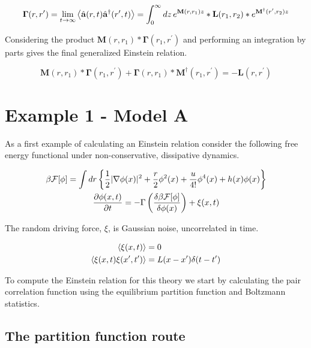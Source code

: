 \begin{equation}
	\mathbf{\Gamma}(r, r^\prime) = \lim_{t\rightarrow\infty} \left\langle \hat{\mathbf{a}}(r, t)\hat{\mathbf{a}}^\dagger(r^\prime, t) \right\rangle =
	\int_0^\infty dz \,e^{\mathbf{M}(r, r_1)z}\ast\mathbf{L}(r_1, r_2)\ast e^{\mathbf{M}^\dagger(r^\prime, r_2)z}
\end{equation}

Considering the product $\mathbf{M}(r, r_1)\ast\mathbf{\Gamma}(r_1, r^\prime)$ and performing an integration by parts gives the final generalized Einstein relation.

\begin{equation}
	\mathbf{M}(r, r_1)\ast\mathbf{\Gamma}(r_1, r^\prime) + \mathbf{\Gamma}(r, r_1)\ast\mathbf{M}^\dagger(r_1, r^\prime) = -\mathbf{L}(r, r^\prime)
\end{equation}

\section{Example 1 - Model A}

As a first example of calculating an Einstein relation consider the following free energy functional under non-conservative, dissipative dynamics.

\begin{gather}
\beta \mathcal{F}[\phi] = \int dr \left\lbrace \frac{1}{2}\vert \nabla \phi(x) \vert^2 + \frac{r}{2}\phi^2(x) + \frac{u}{4!}\phi^4(x)  + h(x)\phi(x)\right\rbrace \\
\frac{\partial \phi(x,t)}{\partial t} = -\Gamma \left(\frac{\delta \beta \mathcal{F}[\phi]}{\delta \phi(x)}\right) + \xi(x, t)
\end{gather}

The random driving force, $\xi$, is Gaussian noise, uncorrelated in time.

\begin{align}
\left\langle \xi (x, t) \right\rangle &= 0 \\
\left\langle \xi (x, t) \xi(x^\prime, t^\prime) \right\rangle  &= L(x-x^\prime) \delta (t - t^\prime)
\end{align}

To compute the Einstein relation for this theory we start by calculating the pair correlation function using the equilibrium partition function and Boltzmann statistics.

\subsection{The partition function route}

